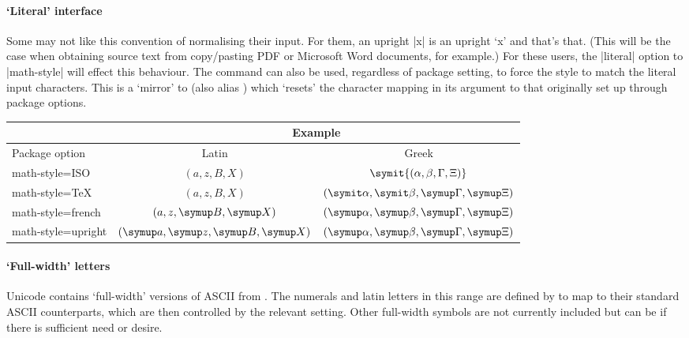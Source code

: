 \paragraph{`Literal' interface}
Some may not like this convention of normalising their input.
For them, an upright |x| is an upright `x' and that's that.
(This will be the case when obtaining source text from copy/pasting PDF or
Microsoft Word documents, for example.)
For these users, the |literal| option to |math-style| will effect this behaviour.
The  command can also be used, regardless of package setting, to force the style to match the literal input characters.
This is a `mirror' to  (also alias ) which `resets' the character mapping in its argument to that originally set up through package options.


\begin{table}
  \centering
  \begin{tabular}{@{}>{\ttfamily}lcc@{}}
    \toprule
      & \multicolumn{2}{c}{Example} \\
       \cmidrule(l){2-3}
      \rmfamily Package option & Latin & Greek \\
    \midrule
      math-style=ISO & $(a,z,B,X)$ & $\symit{(\alpha,\beta,\Gamma,\Xi)}$ \\
      math-style=TeX & $(a,z,B,X)$ & $(\symit\alpha,\symit\beta,\symup\Gamma,\symup\Xi)$ \\
      math-style=french & $(a,z,\symup B,\symup X)$ & $(\symup\alpha,\symup\beta,\symup\Gamma,\symup\Xi)$ \\
      math-style=upright & $(\symup a,\symup z,\symup B,\symup X)$ & $(\symup\alpha,\symup\beta,\symup\Gamma,\symup\Xi)$ \\
    \bottomrule
  \end{tabular}
\end{table}

\paragraph{`Full-width' letters}
Unicode contains `full-width' versions of ASCII from .
The numerals and latin letters in this range are defined by 
to map to their standard ASCII counterparts, which are then controlled by the relevant  setting.
Other full-width symbols are not currently included but can be if there is sufficient need or desire.

